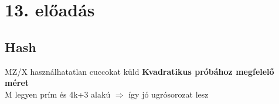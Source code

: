 \section{13. előadás}

\subsection{Hash}

\begin{tetel}{MZ/X használhatatlan cuccokat küld}
 \textbf{Kvadratikus próbához megfelelő méret} \\[3pt]
	 M legyen prím és 4k+3 alakú $\Rightarrow$ így jó ugrósorozat lesz \\[4pt]
   \end{tetel}

	 \notBiz \\[0pt]
